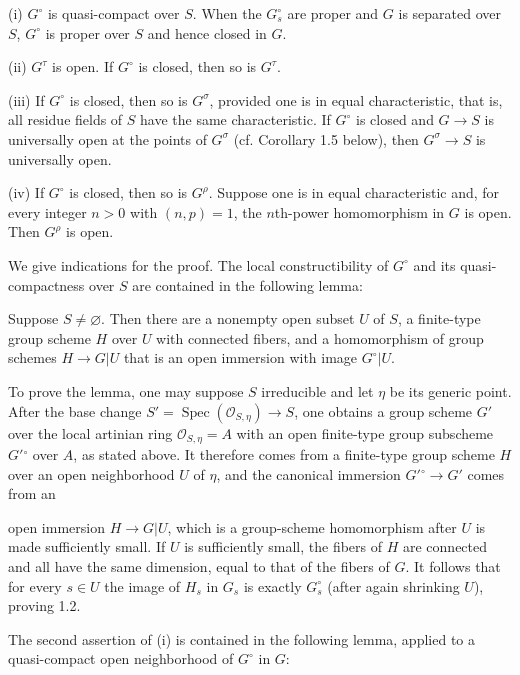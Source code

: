 \noindent (i) $G^\circ$ is quasi-compact over $S$. When the $G_s^\circ$ are
proper and $G$ is separated over $S$, $G^\circ$ is proper over $S$ and hence
closed in $G$.

\noindent (ii) $G^\tau$ is open. If $G^\circ$ is closed, then so is $G^\tau$.

\noindent (iii) If $G^\circ$ is closed, then so is $G^\sigma$, provided one is
in equal characteristic, that is, all residue fields of $S$ have the same
characteristic. If $G^\circ$ is closed and $G\longrightarrow S$ is universally
open at the points of $G^\sigma$ (cf. Corollary 1.5 below), then
$G^\sigma\longrightarrow S$ is universally open.

\noindent (iv) If $G^\circ$ is closed, then so is $G^\rho$. Suppose one is in
equal characteristic and, for every integer $n>0$ with $(n,p)=1$, the
$n$th-power homomorphism in $G$ is open. Then $G^\rho$ is open.

We give indications for the proof. The local constructibility of $G^\circ$ and
its quasi-compactness over $S$ are contained in the following lemma:

 Suppose $S\neq\varnothing$. Then there are a nonempty open
subset $U$ of $S$, a finite-type group scheme $H$ over $U$ with connected
fibers, and a homomorphism of group schemes $H\longrightarrow G|U$ that is an
open immersion with image $G^\circ|U$.

To prove the lemma, one may suppose $S$ irreducible and let $\eta$ be its
generic point. After the base change
$S'=\operatorname{Spec}(\mathcal O_{S,\eta})\longrightarrow S$, one obtains a
group scheme $G'$ over the local artinian ring $\mathcal O_{S,\eta}=A$ with an
open finite-type group subscheme $G'{}^\circ$ over $A$, as stated above. It
therefore comes from a finite-type group scheme $H$ over an open neighborhood
$U$ of $\eta$, and the canonical immersion
$G'{}^\circ\longrightarrow G'$ comes from an

open immersion $H\longrightarrow G|U$, which is a group-scheme homomorphism
after $U$ is made sufficiently small. If $U$ is sufficiently small, the fibers
of $H$ are connected and all have the same dimension, equal to that of the
fibers of $G$. It follows that for every $s\in U$ the image of $H_s$ in $G_s$
is exactly $G_s^\circ$ (after again shrinking $U$), proving 1.2.

The second assertion of (i) is contained in the following lemma, applied to a
quasi-compact open neighborhood of $G^\circ$ in $G$:

